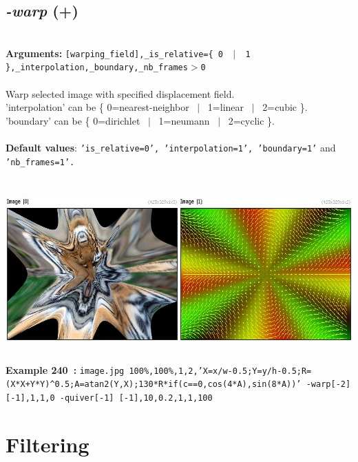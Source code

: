 \documentclass[a4paper,11pt,twoside]{book}
\begin{document}
\subsection{\emph{-warp} (+)}\vspace*{-0.5em}
~\\\textbf{Arguments: } 
{\small \texttt{[warping\_field],\_is\_relative=\{ 0 ~$|$~ 1 \},\_interpolation,\_boundary,\_nb\_frames$>$0}}\\~\\
Warp selected image with specified displacement field.
~\\'interpolation' can be \{ 0=nearest-neighbor ~$|$~ 1=linear ~$|$~ 2=cubic \}.
~\\'boundary' can be \{ 0=dirichlet ~$|$~ 1=neumann ~$|$~ 2=cyclic \}.
~\\~\\\textbf{Default values}: {\small \texttt{'is\_relative=0', 'interpolation=1', 'boundary=1'} and \texttt{'nb\_frames=1'.}}
\begin{center}\includegraphics[keepaspectratio=true,height=7cm,width=\textwidth]{img/gmic_def240.jpg}\\
{\footnotesize \textbf{Example 240~:} \texttt{image.jpg 100\%,100\%,1,2,'X=x/w-0.5;Y=y/h-0.5;R=(X*X+Y*Y)\textasciicircum 0.5;A=atan2(Y,X);130*R*if(c==0,cos(4*A),sin(8*A))' -warp[-2] [-1],1,1,0 -quiver[-1] [-1],10,0.2,1,1,100}}
\end{center}
\section{Filtering}
\end{document}
